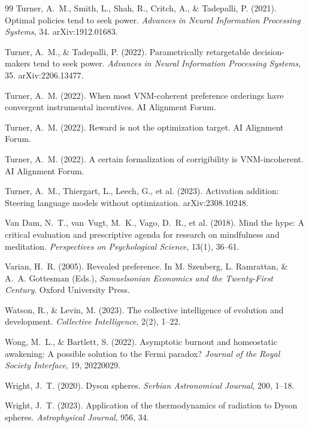 \documentclass[11pt,a4paper,twocolumn]{article}
\begin{document}
\begin{thebibliography}{99}
 Turner, A.~M., Smith, L., Shah, R., Critch, A., \& Tadepalli, P. (2021). Optimal policies tend to seek power. \textit{Advances in Neural Information Processing Systems}, 34. arXiv:1912.01683.

 Turner, A.~M., \& Tadepalli, P. (2022). Parametrically retargetable decision-makers tend to seek power. \textit{Advances in Neural Information Processing Systems}, 35. arXiv:2206.13477.

 Turner, A.~M. (2022). When most VNM-coherent preference orderings have convergent instrumental incentives. AI Alignment Forum.

 Turner, A.~M. (2022). Reward is not the optimization target. AI Alignment Forum.

 Turner, A.~M. (2022). A certain formalization of corrigibility is VNM-incoherent. AI Alignment Forum.

 Turner, A.~M., Thiergart, L., Leech, G., et al. (2023). Activation addition: Steering language models without optimization. arXiv:2308.10248.

 Van Dam, N.~T., van~Vugt, M.~K., Vago, D.~R., et al. (2018). Mind the hype: A critical evaluation and prescriptive agenda for research on mindfulness and meditation. \textit{Perspectives on Psychological Science}, 13(1), 36--61.

 Varian, H.~R. (2005). Revealed preference. In M. Szenberg, L. Ramrattan, \& A.~A. Gottesman (Eds.), \textit{Samuelsonian Economics and the Twenty-First Century}. Oxford University Press.

 Watson, R., \& Levin, M. (2023). The collective intelligence of evolution and development. \textit{Collective Intelligence}, 2(2), 1--22.

 Wong, M.~L., \& Bartlett, S. (2022). Asymptotic burnout and homeostatic awakening: A possible solution to the Fermi paradox? \textit{Journal of the Royal Society Interface}, 19, 20220029.

 Wright, J.~T. (2020). Dyson spheres. \textit{Serbian Astronomical Journal}, 200, 1--18.

 Wright, J.~T. (2023). Application of the thermodynamics of radiation to Dyson spheres. \textit{Astrophysical Journal}, 956, 34.

\end{thebibliography}
\end{document}
